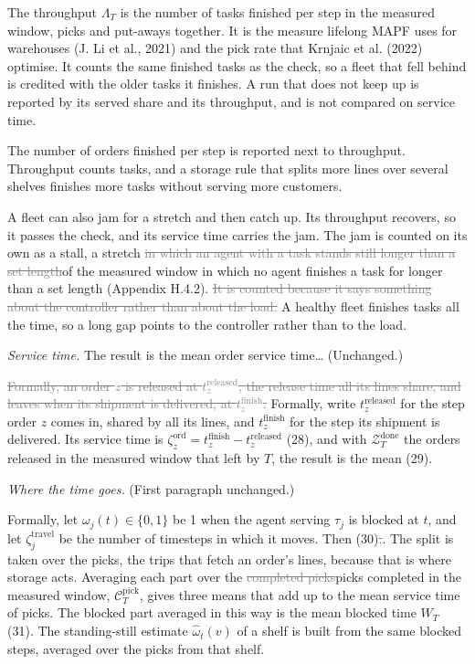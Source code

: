\documentclass[11pt,a4paper]{article}
\newcommand{\new}[1]{\textcolor{newc}{#1}}
\newcommand{\old}[1]{\textcolor{gray}{\sout{#1}}}
\newenvironment{greenblock}{\color{newc}}{}
\begin{document}
\begin{greenblock}
The throughput $\Lambda_T$ is the number of tasks finished per step in the
measured window, picks and put-aways together. It is the measure lifelong
MAPF uses for warehouses (J. Li et al., 2021) and the pick rate that Krnjaic
et al. (2022) optimise. It counts the same finished tasks as the check, so a
fleet that fell behind is credited with the older tasks it finishes. A run
that does not keep up is reported by its served share and its throughput,
and is not compared on service time.

The number of orders finished per step is reported next to throughput.
Throughput counts tasks, and a storage rule that splits more lines over
several shelves finishes more tasks without serving more customers.
\end{greenblock}

A fleet can also jam for a stretch and then catch up. Its throughput
recovers, so it passes the check, and its service time carries the jam. The
jam is counted on its own as a stall, a stretch \old{in which an agent with a
task stands still longer than a set length}\new{of the measured window in
which no agent finishes a task for longer than a set length} (Appendix
H.4.2). \old{It is counted because it says something about the controller
rather than about the load.} \new{A healthy fleet finishes tasks all the
time, so a long gap points to the controller rather than to the load.}

\textit{Service time.} The result is the mean order service time\ldots{}
(Unchanged.)

\old{Formally, an order $z$ is released at $t_z^{\mathrm{released}}$, the
release time all its lines share, and leaves when its shipment is delivered,
at $t_z^{\mathrm{finish}}$.} \new{Formally, write $t_z^{\mathrm{released}}$
for the step order $z$ comes in, shared by all its lines, and
$t_z^{\mathrm{finish}}$ for the step its shipment is delivered.} Its service
time is $\zeta^{\mathrm{ord}}_z = t_z^{\mathrm{finish}} -
t_z^{\mathrm{released}}$ (28), and with $\mathcal{Z}^{\mathrm{done}}_T$ the
orders \new{released in the measured window} that left by $T$, the result is
the mean (29).

\textit{Where the time goes.} (First paragraph unchanged.)

Formally, let $\omega_j(t) \in \{0,1\}$ be 1 when the agent serving $\tau_j$
is blocked at $t$, and let $\zeta^{\mathrm{travel}}_j$ be the number of
timesteps in which it moves. Then (30)\old{,}\new{.} The split is taken over
the picks, the trips that fetch an order's lines, because that is where
storage acts. Averaging each part over the \old{completed picks}\new{picks
completed in the measured window, $\mathcal{C}^{\mathrm{pick}}_T$,} gives
three means that add up to the mean service time of picks. The blocked part
averaged in this way is the mean blocked time $W_T$ (31). \new{The
standing-still estimate $\hat\omega_t(v)$ of a shelf is built from the same
blocked steps, averaged over the picks from that shelf.}
\end{document}
